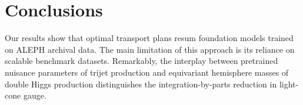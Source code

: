 \section{Conclusions}\label{sec:conclusions}

Our results show that optimal transport plans resum foundation models
trained on ALEPH archival data. The main limitation of this approach is
its reliance on scalable benchmark datasets. Remarkably, the interplay
between pretrained nuisance parameters of trijet production and
equivariant hemisphere masses of double Higgs production distinguishes
the integration-by-parts reduction in light-cone gauge.

